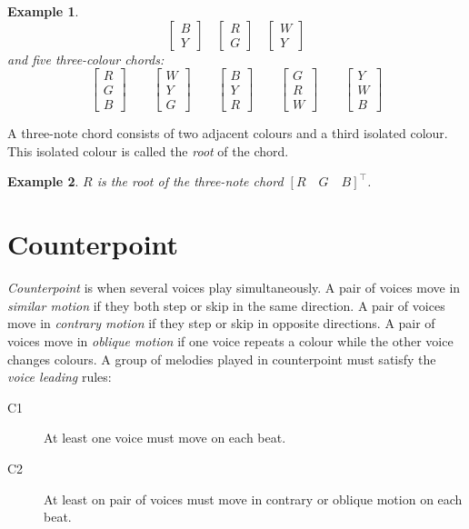 \documentclass{scrartcl}
\newtheorem{example}{Example}
\begin{document}
\begin{example}
\begin{equation}
\begin{bmatrix}
B \\ Y
\end{bmatrix}
\quad
\begin{bmatrix}
R \\ G
\end{bmatrix}
\quad
\begin{bmatrix}
W \\ Y
\end{bmatrix}
\end{equation}
and five three-colour chords:
\begin{equation}\nonumber
\begin{bmatrix}
R \\ G \\ B
\end{bmatrix}
\qquad
\begin{bmatrix}
W \\ Y \\ G
\end{bmatrix}
\qquad
\begin{bmatrix}
B \\ Y \\ R
\end{bmatrix}
\qquad
\begin{bmatrix}
G \\ R \\ W
\end{bmatrix}
\qquad
\begin{bmatrix}
Y \\ W \\ B
\end{bmatrix}
\end{equation}
\end{example}
A three-note chord consists of two adjacent colours and a third isolated colour. This isolated colour is called the \emph{root} of the chord.
\begin{example}
$R$ is the root of the three-note chord $\left[R \quad G \quad B\right]^{\top}$.
\end{example}

\section{Counterpoint}
\emph{Counterpoint} is when several voices play simultaneously. A pair of voices move in \emph{similar motion} if they both step or skip in the same direction. A pair of voices move in \emph{contrary motion} if they step or skip in opposite directions.  A pair of voices move in \emph{oblique motion} if one voice repeats a colour while the other voice changes colours.  A group of melodies played in counterpoint must satisfy the \emph{voice leading} rules:
\begin{description}
	\item[C1] At least one voice must move on each beat.
	\item[C2] At least on pair of voices must move in contrary or oblique motion on each beat.
\end{description}
\end{document}
